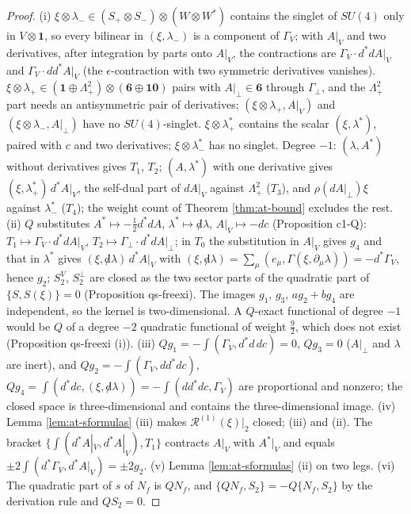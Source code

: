 \documentclass[11pt]{article}
\numberwithin{equation}{section}
\theoremstyle{plain}
\theoremstyle{definition}
\newcommand{\Ap}{A|_{\perp}}
\newcommand{\AV}{A|_V}
\newcommand{\dslash}{{\not d}}
\begin{document}
\begin{proof}
(i) $\xi\otimes\lambda_-\in(S_+\otimes S_-)\otimes(W\otimes W^*)$ contains the singlet of $SU(4)$ only in $V\otimes\mathbf 1$, so every bilinear in $(\xi,\lambda_-)$ is a component of $\Gamma_V$; with $\AV$ and two derivatives, after integration by parts onto $\AV$, the contractions are $\Gamma_V\cdot d^*d\AV$ and $\Gamma_V\cdot dd^*\AV$ (the $\epsilon$-contraction with two symmetric derivatives vanishes). $\xi\otimes\lambda_+\in(\mathbf 1\oplus\Lambda^2_+)\otimes(\mathbf 6\oplus\mathbf{10})$ pairs with $\Ap\in\mathbf 6$ through $\Gamma_\perp$, and the $\Lambda^2_+$ part needs an antisymmetric pair of derivatives; $(\xi\otimes\lambda_+,\AV)$ and $(\xi\otimes\lambda_-,\Ap)$ have no $SU(4)$-singlet. $\xi\otimes\lambda^*_+$ contains the scalar $(\xi,\lambda^*)$, paired with $c$ and two derivatives; $\xi\otimes\lambda^*_-$ has no singlet. Degree $-1$: $(\lambda,A^*)$ without derivatives gives $T_1$, $T_2$; $(A,\lambda^*)$ with one derivative gives $(\xi,\lambda^*_+)\,d^*\AV$, the self-dual part of $d\AV$ against $\Lambda^2_+$ ($T_3$), and $\rho(d\Ap)\xi$ against $\lambda^*_-$ ($T_4$); the weight count of Theorem \ref{thm:at-bound} excludes the rest. (ii) $Q$ substitutes $A^*\mapsto-\tfrac12d^*dA$, $\lambda^*\mapsto\dslash\lambda$, $\AV\mapsto-dc$ (Proposition c1-Q): $T_1\mapsto\Gamma_V\cdot d^*d\AV$, $T_2\mapsto\Gamma_\perp\cdot d^*d\Ap$; in $T_0$ the substitution in $\AV$ gives $g_4$ and that in $\lambda^*$ gives $(\xi,\dslash\lambda)\,d^*\AV$ with $(\xi,\dslash\lambda)=\sum_\mu(e_\mu,\Gamma(\xi,\partial_\mu\lambda))=-d^*\Gamma_V$, hence $g_2$; $S^V_2$, $S^\perp_2$ are closed as the two sector parts of the quadratic part of $\{S,S(\xi)\}=0$ (Proposition qs-freexi). The images $g_1$, $g_3$, $ag_2+bg_4$ are independent, so the kernel is two-dimensional. A $Q$-exact functional of degree $-1$ would be $Q$ of a degree $-2$ quadratic functional of weight $\tfrac92$, which does not exist (Proposition qs-freexi (i)). (iii) $Qg_1=-\int(\Gamma_V,d^*d\,dc)=0$, $Qg_3=0$ ($\Ap$ and $\lambda$ are inert), and $Qg_2=-\int(\Gamma_V,dd^*dc)$, $Qg_4=\int(d^*dc,(\xi,\dslash\lambda))=-\int(dd^*dc,\Gamma_V)$ are proportional and nonzero; the closed space is three-dimensional and contains the three-dimensional image. (iv) Lemma \ref{lem:at-sformulas} (iii) makes $\mathcal R^{(1)}(\xi)|_2$ closed; (iii) and (ii). The bracket $\{\int(d^*\AV,d^*\AV),T_1\}$ contracts $\AV$ with $A^*|_V$ and equals $\pm2\int(d^*\Gamma_V,d^*\AV)=\pm2g_2$. (v) Lemma \ref{lem:at-sformulas} (ii) on two legs. (vi) The quadratic part of $s$ of $N_f$ is $QN_f$, and $\{QN_f,S_2\}=-Q\{N_f,S_2\}$ by the derivation rule and $QS_2=0$.
\end{proof}
\end{document}
